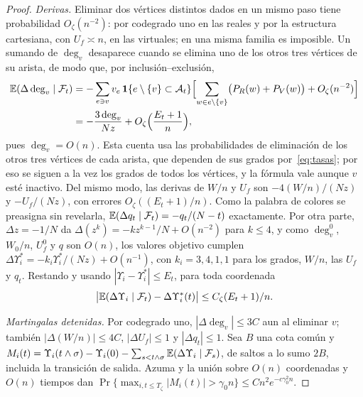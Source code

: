 \begin{proof}
\emph{Derivas.} Eliminar dos vértices distintos dados en un mismo paso tiene probabilidad
$O_\zeta(n^{-2})$: por codegrado uno en las reales y por la estructura cartesiana, con
$U_f\asymp n$, en las virtuales; en una misma familia es imposible. Un sumando de $\deg_v$
desaparece cuando se elimina uno de los otros tres vértices de su arista, de modo que, por
inclusión--exclusión,
\[
\begin{aligned}
 \mathbb{E}(\Delta\deg_v\mid\mathcal F_t)&=-\sum_{e\ni v}v_e\,\mathbf{1}\{e\setminus\{v\}\subset\mathcal A_t\}
 \Bigl[\sum_{w\in e\setminus\{v\}}\bigl(P_R(w)+P_V(w)\bigr)+O_\zeta(n^{-2})\Bigr]\\
 &=-\frac{3\deg_v}{Nz}+O_\zeta\Bigl(\frac{E_t+1}n\Bigr),
\end{aligned}
\]
pues $\deg_v=O(n)$. Esta cuenta usa las probabilidades de eliminación de los otros tres vértices
de cada arista, que dependen de sus grados por~\eqref{eq:tasas}; por eso se siguen a la vez los
grados de todos los vértices, y la fórmula vale aunque $v$ esté inactivo. Del mismo modo, las
derivas de $W/n$ y $U_f$ son $-4(W/n)/(Nz)$ y $-U_f/(Nz)$, con errores $O_\zeta((E_t+1)/n)$. Como
la palabra de colores se preasigna sin revelarla, $\mathbb{E}(\Delta q_t\mid\mathcal F_t)=-q_t/(N-t)$
exactamente. Por otra parte, $\Delta z=-1/N$ da $\Delta(z^k)=-kz^{k-1}/N+O(n^{-2})$ para $k\le4$,
y como $\deg_v^0$, $W_0/n$, $U_f^0$ y $q$ son $O(n)$, los valores objetivo cumplen
$\Delta\Upsilon_i^*=-k_i\Upsilon_i^*/(Nz)+O(n^{-1})$, con $k_i=3,4,1,1$ para los grados, $W/n$,
las $U_f$ y $q_t$. Restando y usando $|\Upsilon_i-\Upsilon_i^*|\le E_t$, para toda coordenada
\begin{equation}\label{eq:deriva}
 \bigl|\mathbb{E}(\Delta \Upsilon_i\mid\mathcal F_t)-\Delta \Upsilon_i^*(t)\bigr|\le C_\zeta(E_t+1)/n .
\end{equation}

\emph{Martingalas detenidas.} Por codegrado uno, $|\Delta\deg_v|\le3C$ aun al eliminar $v$;
también $|\Delta(W/n)|\le4C$, $|\Delta U_f|\le1$ y $|\Delta q_t|\le1$. Sea $B$ una cota común y
$M_i(t)=\Upsilon_i(t\wedge\sigma)-\Upsilon_i(0)-\sum_{s<t\wedge\sigma}\mathbb{E}(\Delta \Upsilon_i\mid\mathcal
F_s)$, de
saltos a lo sumo $2B$, incluida la transición de salida. Azuma y la unión sobre $O(n)$
coordenadas y $O(n)$ tiempos dan
$\Pr\{\max_{i,t\le T_\zeta}|M_i(t)|>\gamma_0n\}\le Cn^2e^{-c\gamma_0^2n}$.


\end{proof}
